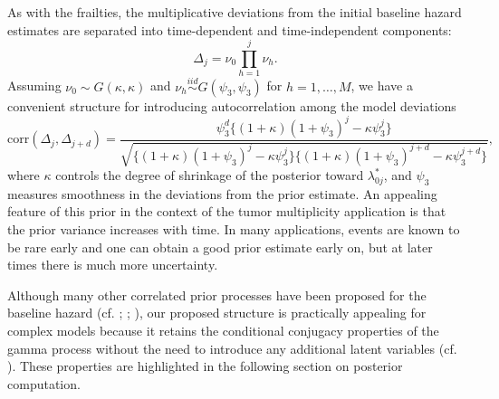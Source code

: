 \documentclass[10pt, letterpaper]{article}
\begin{document}
As with the frailties, the multiplicative deviations from the initial baseline hazard estimates are separated into time-dependent and time-independent components:
\begin{equation} \label{eq:5}
\Delta_j = \nu_0 \prod_{h=1}^{j} \nu_h.
\end{equation}
Assuming $\nu_0 \sim G(\kappa, \kappa)$ and $\nu_h \stackrel{iid}{\sim} G(\psi_3, \psi_3)$ for $h = 1, \dots, M$, we have a convenient structure for introducing autocorrelation among the model deviations
\begin{equation} \label{eq:6}
\text{corr}(\Delta_j, \Delta_{j+d}) = \frac{\psi_3^d \{ (1 + \kappa)(1 + \psi_3)^j - \kappa \psi_3^j \}}{\sqrt{\{ (1 + \kappa)(1 + \psi_3)^j - \kappa \psi_3^j \} \{ (1 + \kappa)(1 + \psi_3)^{j+d} - \kappa \psi_3^{j+d} \}}},
\end{equation}
where $\kappa$ controls the degree of shrinkage of the posterior toward $\lambda_{0j}^*$, and $\psi_3$ measures smoothness in the deviations from the prior estimate. An appealing feature of this prior in the context of the tumor multiplicity application is that the prior variance increases with time. In many applications, events are known to be rare early and one can obtain a good prior estimate early on, but at later times there is much more uncertainty.

Although many other correlated prior processes have been proposed for the baseline hazard (cf. \citealp{Gamerman1991}; \citealp{Arjas1994}; \citealp{Gustafson2003}), our proposed structure is practically appealing for complex models because it retains the conditional conjugacy properties of the gamma process \citep{Kalbfleisch1978} without the need to introduce any additional latent variables (cf. \citealp{NietoBarajas2002}). These properties are highlighted in the following section on posterior computation.
\end{document}
